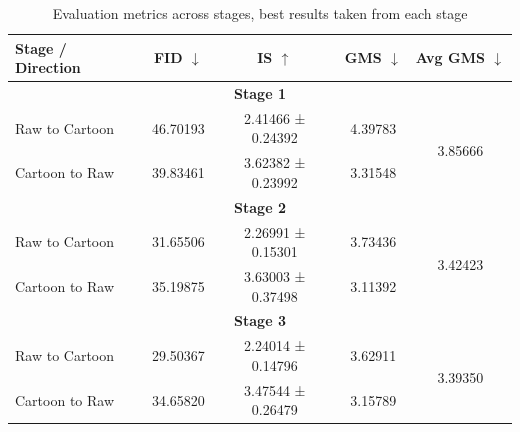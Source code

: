\documentclass[twoside,english,notitlepage]{report}
\begin{document}
\begin{table}[h]
    \centering
    \begin{tabular}{|l|c|c|c|c|}
    \hline
    \textbf{Stage / Direction} & \textbf{FID} $\downarrow$ & \textbf{IS} $\uparrow$ & \textbf{GMS} $\downarrow$ & \textbf{Avg GMS} $\downarrow$ \\
    \hline
    \multicolumn{5}{|c|}{\textbf{Stage 1}} \\
    \hline
    Raw to Cartoon     & 46.70193     & 2.41466 ± 0.24392   & 4.39783    & \multirow{2}{*}{3.85666} \\
    Cartoon to Raw     & 39.83461         & 3.62382 ± 0.23992        & 3.31548        &            \\
    \hline
    \multicolumn{5}{|c|}{\textbf{Stage 2}} \\
    \hline
    Raw to Cartoon     & 31.65506     & 2.26991 ± 0.15301   & 3.73436    & \multirow{2}{*}{3.42423} \\
    Cartoon to Raw     & 35.19875     & 3.63003 ± 0.37498   & 3.11392    &            \\
    \hline
    \multicolumn{5}{|c|}{\textbf{Stage 3}} \\
    \hline
    Raw to Cartoon     & 29.50367     & 2.24014 ± 0.14796   & 3.62911    & \multirow{2}{*}{3.39350} \\
    Cartoon to Raw     & 34.65820     & 3.47544 ± 0.26479   & 3.15789    &            \\
    \hline
    \end{tabular}
    \caption{Evaluation metrics across stages, best results taken from each stage}
    \label{tab:staged-eval}
\end{table}
\end{document}

